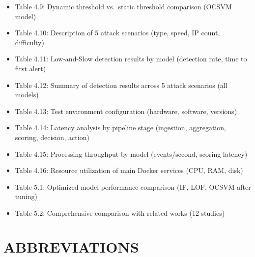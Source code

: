 \documentclass[
  a4paper]{report}
\begin{document}
\begin{itemize}
\item
  Table 4.9: Dynamic threshold vs.~static threshold comparison (OCSVM
  model)
\item
  Table 4.10: Description of 5 attack scenarios (type, speed, IP count,
  difficulty)
\item
  Table 4.11: Low-and-Slow detection results by model (detection rate,
  time to first alert)
\item
  Table 4.12: Summary of detection results across 5 attack scenarios
  (all models)
\item
  Table 4.13: Test environment configuration (hardware, software,
  versions)
\item
  Table 4.14: Latency analysis by pipeline stage (ingestion,
  aggregation, scoring, decision, action)
\item
  Table 4.15: Processing throughput by model (events/second, scoring
  latency)
\item
  Table 4.16: Resource utilization of main Docker services (CPU, RAM,
  disk)
\item
  Table 5.1: Optimized model performance comparison (IF, LOF, OCSVM
  after tuning)
\item
  Table 5.2: Comprehensive comparison with related works (12 studies)
\end{itemize}

\section{ABBREVIATIONS}\label{abbreviations}
\end{document}
